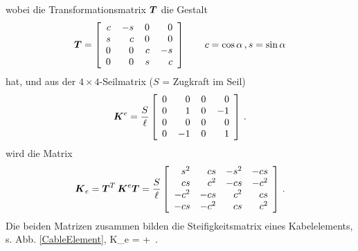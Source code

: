 wobei die Transformationsmatrix $\vek T$ die Gestalt
\begin{align}
\vek T =
\left[\barr{r @{\hspace{4mm}}r @{\hspace{4mm}}r @{\hspace{4mm}}r} c & - s & 0 & 0 \\ s & c &0 & 0\\0 & 0 & c & -s \\ 0 & 0 & s & c\earr \right]
 \qquad c = \cos \alpha\,, s = \sin \alpha
\end{align}
hat, und aus der $4 \times 4$-Seilmatrix ($S$ = Zugkraft im Seil)
\begin{align}
\vek K^e = \frac{S}{\ell} \left[\barr{r @{\hspace{4mm}}r @{\hspace{4mm}}r @{\hspace{4mm}}r} 0 & 0 & 0 & 0\\ 0 & 1 & 0 & -1 \\  0 & 0 & 0 & 0\\ 0 & -1 & 0 &1 \earr\right]\,.
\end{align}
wird die Matrix
\begin{align}
\vek K_e = \vek T^T\,\vek K^e \vek T = \frac{S}{\ell }
 \left[\barr{r r r r} s^2 &  cs & -s^2 & -cs \\ cs & c^2 & -cs & -c^2\\ -c^2 & -cs & c^2 &cs \\ -cs & -c^2 & cs &c^2\earr\right]\,.
\end{align}
Die beiden Matrizen zusammen bilden die Steifigkeitsmatrix eines Kabelelements, s. Abb. \ref{CableElement},
\bfo
\vek K_e =  + \,.
\nn \\
